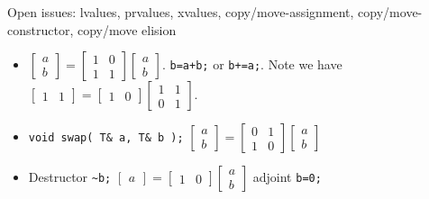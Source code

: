 \documentclass[9pt]{beamer}
\begin{document}
\begin{frame}[fragile]{Open issues: lvalues, prvalues, xvalues, copy/move-assignment, copy/move-constructor, copy/move elision}
\begin{itemize}
 \item  $\begin{bmatrix} a \\ b \end{bmatrix} = \begin{bmatrix} 1 & 0 \\ 1 & 1 \end{bmatrix} \begin{bmatrix} a \\ b \end{bmatrix}$. \lstinline|b=a+b;| or \lstinline|b+=a;|. Note we have  $ \begin{bmatrix} 1 & 1 \end{bmatrix} =  \begin{bmatrix} 1 &  0 \end{bmatrix}  \begin{bmatrix} 1 & 1 \\ 0 & 1 \end{bmatrix} $.
 \item  \lstinline|void swap( T& a, T& b );| $\begin{bmatrix} a \\ b \end{bmatrix} = \begin{bmatrix} 0 & 1 \\ 1 & 0 \end{bmatrix} \begin{bmatrix} a \\ b \end{bmatrix}$
 \item Destructor \lstinline|~b;| $\begin{bmatrix} a \end{bmatrix} = \begin{bmatrix} 1 & 0 \end{bmatrix} \begin{bmatrix} a \\ b \end{bmatrix}$ adjoint \lstinline|b=0;|
\end{itemize}
\end{frame}
\end{document}
